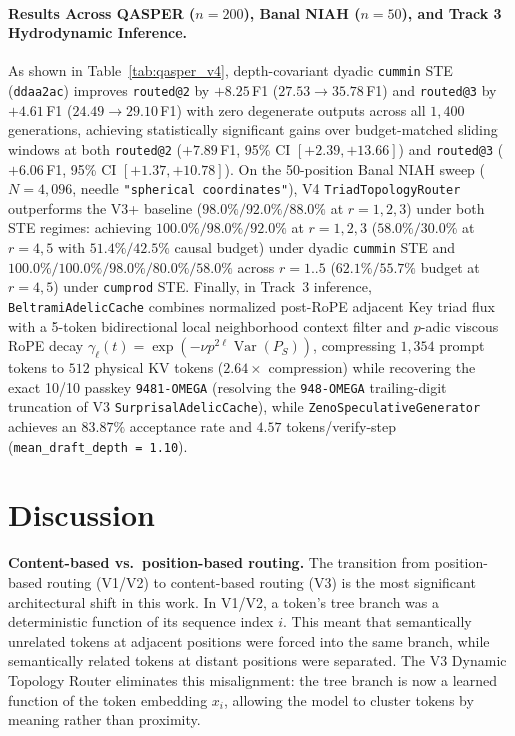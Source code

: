 \documentclass[11pt,a4paper]{article}
\begin{document}
\paragraph{Results Across QASPER ($n=200$), Banal NIAH ($n=50$), and Track 3 Hydrodynamic Inference.}
As shown in Table~\ref{tab:qasper_v4}, depth-covariant dyadic \texttt{cummin} STE (\texttt{ddaa2ac}) improves \texttt{routed@2} by $+8.25$\,F1 ($27.53 \to 35.78$\,F1) and \texttt{routed@3} by $+4.61$\,F1 ($24.49 \to 29.10$\,F1) with zero degenerate outputs across all $1{,}400$ generations, achieving statistically significant gains over budget-matched sliding windows at both \texttt{routed@2} ($+7.89$\,F1, 95\% CI $[+2.39, +13.66]$) and \texttt{routed@3} ($+6.06$\,F1, 95\% CI $[+1.37, +10.78]$). On the 50-position Banal NIAH sweep ($N=4{,}096$, needle \texttt{"spherical coordinates"}), V4 \texttt{TriadTopologyRouter} outperforms the V3+ baseline ($98.0\% / 92.0\% / 88.0\%$ at $r=1,2,3$) under both STE regimes: achieving $\mathbf{100.0\% / 98.0\% / 92.0\%}$ at $r=1,2,3$ ($58.0\% / 30.0\%$ at $r=4,5$ with $51.4\% / 42.5\%$ causal budget) under dyadic \texttt{cummin} STE and $\mathbf{100.0\% / 100.0\% / 98.0\% / 80.0\% / 58.0\%}$ across $r=1..5$ ($62.1\% / 55.7\%$ budget at $r=4,5$) under \texttt{cumprod} STE. Finally, in Track~3 inference, \texttt{BeltramiAdelicCache} combines normalized post-RoPE adjacent Key triad flux with a 5-token bidirectional local neighborhood context filter and $p$-adic viscous RoPE decay $\gamma_\ell(t) = \exp(-\nu p^{2\ell} \operatorname{Var}(P_S))$, compressing $1{,}354$ prompt tokens to $512$ physical KV tokens ($2.64\times$ compression) while recovering the exact 10/10 passkey \texttt{9481-OMEGA} (resolving the \texttt{948-OMEGA} trailing-digit truncation of V3 \texttt{SurprisalAdelicCache}), while \texttt{ZenoSpeculativeGenerator} achieves an $83.87\%$ acceptance rate and $4.57$ tokens/verify-step (\texttt{mean\_draft\_depth = 1.10}).

\section{Discussion}

\textbf{Content-based vs.\ position-based routing.} The transition from position-based routing (V1/V2) to content-based routing (V3) is the most significant architectural shift in this work. In V1/V2, a token's tree branch was a deterministic function of its sequence index $i$. This meant that semantically unrelated tokens at adjacent positions were forced into the same branch, while semantically related tokens at distant positions were separated. The V3 Dynamic Topology Router eliminates this misalignment: the tree branch is now a learned function of the token embedding $x_i$, allowing the model to cluster tokens by meaning rather than proximity.
\end{document}
